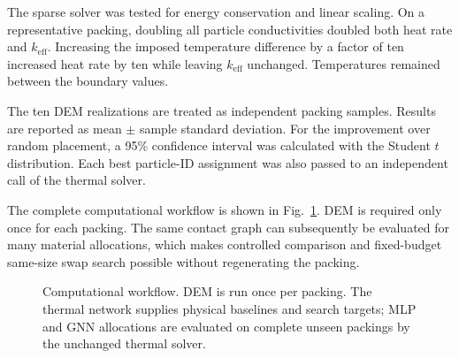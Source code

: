 \documentclass[12pt,a4paper]{article}
\begin{document}
	The sparse solver was tested for energy conservation and linear scaling. On a
	representative packing, doubling all particle conductivities doubled both heat
	rate and $k_{\mathrm{eff}}$. Increasing the imposed temperature difference by
	a factor of ten increased heat rate by ten while leaving $k_{\mathrm{eff}}$
	unchanged. Temperatures remained between the boundary values.
	
	The ten DEM realizations are treated as independent packing samples. Results
	are reported as mean $\pm$ sample standard deviation. For the improvement over
	random placement, a 95\% confidence interval was calculated with the Student
	$t$ distribution. Each best particle-ID assignment was also passed to an
	independent call of the thermal solver.
	
	The complete computational workflow is shown in Fig.~\ref{fig:workflow}. DEM is
	required only once for each packing. The same contact graph can subsequently be
	evaluated for many material allocations, which makes controlled comparison and
	fixed-budget same-size swap search possible without regenerating the packing.
	
	\begin{figure}[!htbp]
		\centering
		\caption{Computational workflow. DEM is run once per packing. The thermal
			network supplies physical baselines and search targets; MLP and GNN allocations
			are evaluated on complete unseen packings by the unchanged thermal solver.}
		\label{fig:workflow}
	\end{figure}
	
\end{document}
